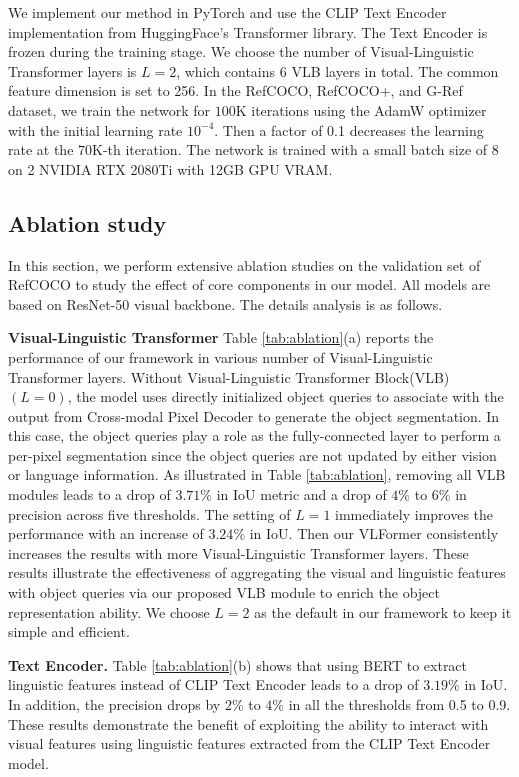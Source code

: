 We implement our method in PyTorch and use the CLIP Text Encoder implementation from HuggingFace's Transformer library. The Text Encoder is frozen during the training stage. We choose the number of Visual-Linguistic Transformer layers is $L = 2$, which contains $6$ VLB layers in total. 
The common feature dimension is set to 256.
In the RefCOCO, RefCOCO+, and G-Ref dataset, we train the network for $100$K iterations using the AdamW optimizer with the initial learning rate $10^{−4}$. Then a factor of 0.1 decreases the learning rate at the $70$K-th iteration. The network is trained with a small batch size of 8 on 2 NVIDIA RTX 2080Ti with 12GB GPU VRAM.


\subsection{Ablation study}

In this section, we perform extensive ablation studies on the validation set of RefCOCO to study the effect of core components in our model. All models are based on ResNet-50 visual backbone. The details analysis is as follows.

\textbf{Visual-Linguistic Transformer} Table \ref{tab:ablation}(a) reports the performance of our framework in various number of Visual-Linguistic Transformer layers. Without Visual-Linguistic Transformer Block(VLB) $(L = 0)$, the model uses directly initialized object queries to associate with the output from Cross-modal Pixel Decoder to generate the object segmentation. In this case, the object queries play a role as the fully-connected layer to perform a per-pixel segmentation since the object queries are not updated by either vision or language information. As illustrated in Table \ref{tab:ablation}, removing all VLB modules leads to a drop of $3.71\%$ in IoU metric and a drop of $4\%$ to $6\%$ in precision across five thresholds. The setting of $L = 1$ immediately improves the performance with an increase of $3.24\%$ in IoU. Then our VLFormer consistently increases the results with more Visual-Linguistic Transformer layers. These results illustrate the effectiveness of aggregating the visual and linguistic features with object queries via our proposed VLB module to enrich the object representation ability. We choose $L = 2$ as the default in our framework to keep it simple and efficient. 

\textbf{Text Encoder.}
Table \ref{tab:ablation}(b) shows that using BERT to extract linguistic features instead of CLIP Text Encoder leads to a drop of $3.19\%$ in IoU. In addition, the precision drops by $2\%$ to $4\%$ in all the thresholds from 0.5 to 0.9. These results demonstrate the benefit of exploiting the ability to interact with visual features using linguistic features extracted from the CLIP Text Encoder model.  


